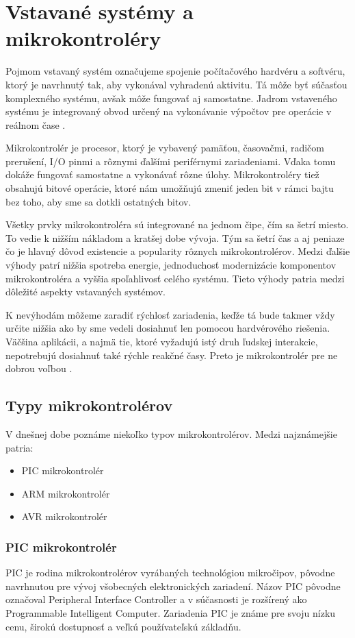 \section{Vstavané systémy a mikrokontroléry}
\noindent
Pojmom vstavaný systém označujeme spojenie počítačového hardvéru a softvéru, ktorý je navrhnutý tak, aby vykonával vyhradenú aktivitu. Tá môže byť súčasťou komplexného systému, avšak môže fungovať aj samostatne. Jadrom vstaveného systému
je integrovaný obvod určený na vykonávanie výpočtov pre operácie v reálnom čase \cite{WhatEmbeddedSystem}. \par
Mikrokontrolér je procesor, ktorý je vybavený pamäťou, časovačmi, radičom prerušení, I/O pinmi a rôznymi ďalšími periférnymi
zariadeniami. Vďaka tomu dokáže fungovať samostatne a vykonávať rôzne úlohy. Mikrokontroléry tiež obsahujú bitové operácie, ktoré nám umožňujú zmeniť jeden bit v rámci bajtu bez toho, aby sme sa dotkli ostatných bitov. \par
Všetky prvky mikrokontroléra sú integrované na jednom čipe, čím sa šetrí miesto.
To vedie k nižším nákladom a kratšej dobe vývoja. Tým sa šetrí čas a aj peniaze čo je hlavný
dôvod existencie a popularity rôznych mikrokontrolérov. Medzi ďalšie výhody patrí nižšia spotreba energie,
jednoduchosť modernizácie komponentov mikrokontroléra a vyššia spoľahlivosť
celého systému. Tieto výhody patria medzi dôležité aspekty vstavaných systémov. \par
K nevýhodám môžeme zaradiť rýchlosť zariadenia, keďže tá bude takmer vždy určite
nižšia ako by sme vedeli dosiahnuť len pomocou hardvérového riešenia. Väčšina aplikácii, a najmä tie, ktoré vyžadujú istý druh ľudskej interakcie, nepotrebujú
dosiahnuť také rýchle reakčné časy. Preto je mikrokontrolér pre ne dobrou voľbou
\cite{guntherIntroductionMicrocontrollers2007}.

\subsection{Typy mikrokontrolérov}
\noindent
V dnešnej dobe poznáme niekoľko typov mikrokontrolérov. Medzi najznámejšie patria:
\begin{itemize}
    \item PIC mikrokontrolér
    \item ARM mikrokontrolér
    \item AVR mikrokontrolér
\end{itemize}

\subsubsection{PIC mikrokontrolér}
\noindent
PIC je rodina mikrokontrolérov vyrábaných technológiou mikročipov, pôvodne navrhnutou pre vývoj všobecných elektronických zariadení.
Názov PIC pôvodne označoval Peripheral Interface Controller a v súčasnosti je
rozšírený ako Programmable Intelligent Computer. Zariadenia PIC je známe pre
svoju nízku cenu, širokú dostupnosť a veľkú používateľskú základňu. \par

